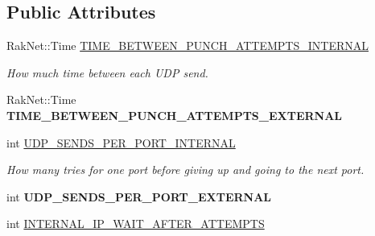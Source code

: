 \subsection*{Public Attributes}
\begin{DoxyCompactItemize}
\item 
\hypertarget{struct_rak_net_1_1_punchthrough_configuration_ab568e5c2391953e5a7d2351360f142e1}{Rak\-Net\-::\-Time \hyperlink{struct_rak_net_1_1_punchthrough_configuration_ab568e5c2391953e5a7d2351360f142e1}{T\-I\-M\-E\-\_\-\-B\-E\-T\-W\-E\-E\-N\-\_\-\-P\-U\-N\-C\-H\-\_\-\-A\-T\-T\-E\-M\-P\-T\-S\-\_\-\-I\-N\-T\-E\-R\-N\-A\-L}}\label{struct_rak_net_1_1_punchthrough_configuration_ab568e5c2391953e5a7d2351360f142e1}

\begin{DoxyCompactList}\small\item\em How much time between each U\-D\-P send. \end{DoxyCompactList}\item 
\hypertarget{struct_rak_net_1_1_punchthrough_configuration_a11c58253a92b23789af4bea12118d038}{Rak\-Net\-::\-Time {\bfseries T\-I\-M\-E\-\_\-\-B\-E\-T\-W\-E\-E\-N\-\_\-\-P\-U\-N\-C\-H\-\_\-\-A\-T\-T\-E\-M\-P\-T\-S\-\_\-\-E\-X\-T\-E\-R\-N\-A\-L}}\label{struct_rak_net_1_1_punchthrough_configuration_a11c58253a92b23789af4bea12118d038}

\item 
\hypertarget{struct_rak_net_1_1_punchthrough_configuration_abf1ea5a9f5744e649d083f8fa1ea2103}{int \hyperlink{struct_rak_net_1_1_punchthrough_configuration_abf1ea5a9f5744e649d083f8fa1ea2103}{U\-D\-P\-\_\-\-S\-E\-N\-D\-S\-\_\-\-P\-E\-R\-\_\-\-P\-O\-R\-T\-\_\-\-I\-N\-T\-E\-R\-N\-A\-L}}\label{struct_rak_net_1_1_punchthrough_configuration_abf1ea5a9f5744e649d083f8fa1ea2103}

\begin{DoxyCompactList}\small\item\em How many tries for one port before giving up and going to the next port. \end{DoxyCompactList}\item 
\hypertarget{struct_rak_net_1_1_punchthrough_configuration_ae22fb7dd453d4dcd37fc9a52e717f780}{int {\bfseries U\-D\-P\-\_\-\-S\-E\-N\-D\-S\-\_\-\-P\-E\-R\-\_\-\-P\-O\-R\-T\-\_\-\-E\-X\-T\-E\-R\-N\-A\-L}}\label{struct_rak_net_1_1_punchthrough_configuration_ae22fb7dd453d4dcd37fc9a52e717f780}

\item 
\hypertarget{struct_rak_net_1_1_punchthrough_configuration_a5422d223ae78645dc7c986bafc3cf11c}{int \hyperlink{struct_rak_net_1_1_punchthrough_configuration_a5422d223ae78645dc7c986bafc3cf11c}{I\-N\-T\-E\-R\-N\-A\-L\-\_\-\-I\-P\-\_\-\-W\-A\-I\-T\-\_\-\-A\-F\-T\-E\-R\-\_\-\-A\-T\-T\-E\-M\-P\-T\-S}}\label{struct_rak_net_1_1_punchthrough_configuration_a5422d223ae78645dc7c986bafc3cf11c}


\end{DoxyCompactItemize}

